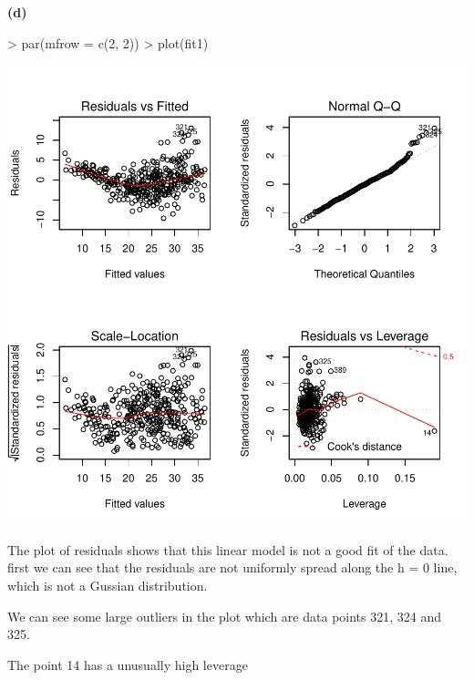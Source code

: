 \documentclass[a4paper]{article}
\renewcommand{\part}[1] {\vspace{.10in} {\bf (#1)}}
\begin{document}
\part{d}
\begin{Schunk}
\begin{Sinput}
> par(mfrow = c(2, 2))
> plot(fit1)
\end{Sinput}
\end{Schunk}
\includegraphics{mutivariblelm-9d}
\begin{enumerate}
{\color{red}
\item The plot of residuals shows that this linear model is not a good fit of the data. first we can see that the residuals are not uniformly spread along the h = 0 line, which is not a Gussian distribution.
\item We can see some large outliers in the plot which are data points 321, 324 and 325.
\item The point 14 has a unusually high leverage
}
\end{enumerate}
\end{document}
